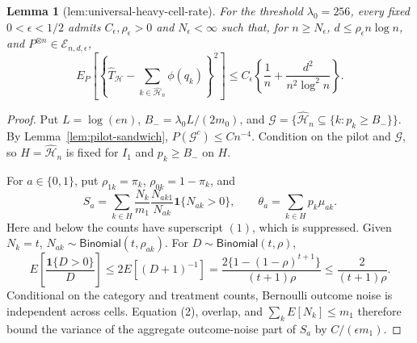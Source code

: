 \documentclass{article}
\newtheorem{lemma}{Lemma}
\begin{document}
\begin{lemma}[lem:universal-heavy-cell-rate]\label{lem:universal-heavy-cell-rate}
For the threshold \(\lambda_0=256\), every fixed \(0<\epsilon<1/2\) admits \(C_\epsilon,\rho_\epsilon>0\) and \(N_\epsilon<\infty\) such that, for \(n\ge N_\epsilon\), \(d\le\rho_\epsilon n\log n\), and \(P^{\otimes n}\in\mathcal E_{n,d,\epsilon}\),
\[
E_P\left[\left\{\widehat T_{\mathcal H}-\sum_{k\in\widehat{\mathcal H}_n}\phi(q_k)\right\}^2\right]\le C_\epsilon\left\{\frac1n+\frac{d^2}{n^2\log^2n}\right\}.
\]
\end{lemma}
\begin{proof}
Put \(L=\log(en)\), \(B_-=\lambda_0L/(2m_0)\), and \(\mathcal G=\{\widehat{\mathcal H}_n\subseteq\{k:p_k\ge B_-\}\}\). By Lemma~\ref{lem:pilot-sandwich}, \(P(\mathcal G^c)\le Cn^{-4}\). Condition on the pilot and \(\mathcal G\), so \(H=\widehat{\mathcal H}_n\) is fixed for \(I_1\) and \(p_k\ge B_-\) on \(H\).

For \(a\in\{0,1\}\), put \(\rho_{1k}=\pi_k\), \(\rho_{0k}=1-\pi_k\), and
\[
S_a=\sum_{k\in H}\frac{N_k}{m_1}\frac{N_{ak1}}{N_{ak}}\mathbf1\{N_{ak}>0\},\qquad \theta_a=\sum_{k\in H}p_k\mu_{ak}.
\tag{1}
\]
Here and below the counts have superscript \((1)\), which is suppressed. Given \(N_k=t\), \(N_{ak}\sim\mathsf{Binomial}(t,\rho_{ak})\). For \(D\sim\mathsf{Binomial}(t,\rho)\),
\[
E\left[\frac{\mathbf1\{D>0\}}D\right]\le2E[(D+1)^{-1}]=\frac{2\{1-(1-\rho)^{t+1}\}}{(t+1)\rho}\le\frac2{(t+1)\rho}.
\tag{2}
\]
Conditional on the category and treatment counts, Bernoulli outcome noise is independent across cells. Equation (2), overlap, and \(\sum_kE[N_k]\le m_1\) therefore bound the variance of the aggregate outcome-noise part of \(S_a\) by \(C/(\epsilon m_1)\).


\end{proof}
\end{document}
